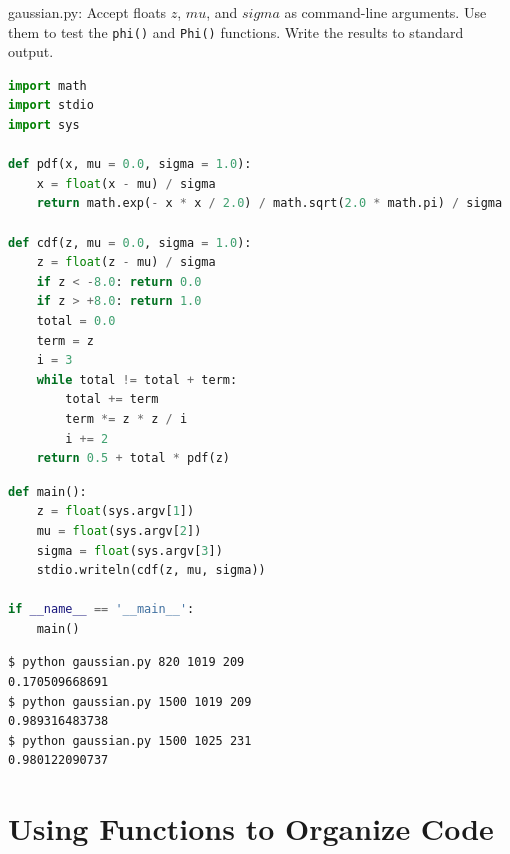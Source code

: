 \documentclass[8pt,a4paper,compress]{beamer}
\begin{document}
\begin{frame}[fragile]
\pause

\begin{framed}
\tiny gaussian.py: Accept floats $z$, $mu$, and $sigma$ as command-line arguments. Use them to test the \lstinline{phi()} and \lstinline{Phi()} functions. Write the results to standard output.
\end{framed}

\begin{lstlisting}[language=Python]
import math
import stdio
import sys

def pdf(x, mu = 0.0, sigma = 1.0):
    x = float(x - mu) / sigma
    return math.exp(- x * x / 2.0) / math.sqrt(2.0 * math.pi) / sigma

def cdf(z, mu = 0.0, sigma = 1.0):
    z = float(z - mu) / sigma
    if z < -8.0: return 0.0
    if z > +8.0: return 1.0
    total = 0.0
    term = z
    i = 3
    while total != total + term:
        total += term
        term *= z * z / i
        i += 2
    return 0.5 + total * pdf(z)
\end{lstlisting}
\end{frame}

\begin{frame}[fragile]
\pause

\begin{lstlisting}[language=Python]
def main():
    z = float(sys.argv[1])
    mu = float(sys.argv[2])
    sigma = float(sys.argv[3])
    stdio.writeln(cdf(z, mu, sigma))

if __name__ == '__main__':
    main()
\end{lstlisting}

\pause

\begin{lstlisting}[language={}]
$ python gaussian.py 820 1019 209
0.170509668691
$ python gaussian.py 1500 1019 209
0.989316483738
$ python gaussian.py 1500 1025 231
0.980122090737
\end{lstlisting}
\end{frame}

\section{Using Functions to Organize Code}
\end{document}
